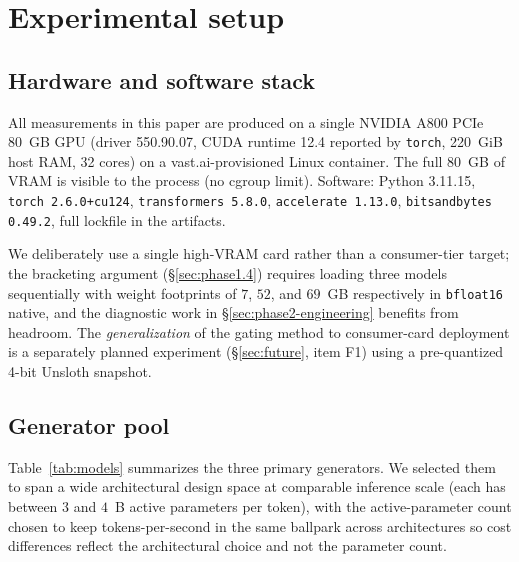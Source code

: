 \documentclass[11pt,letterpaper]{article}
\begin{document}
\section{Experimental setup}
\label{sec:setup}

\subsection{Hardware and software stack}
\label{sec:setup-hw}

All measurements in this paper are produced on a single NVIDIA A800
PCIe 80~GB GPU (driver 550.90.07, CUDA runtime 12.4 reported by
\texttt{torch}, 220~GiB host RAM, 32 cores) on a vast.ai-provisioned
Linux container. The full $80$~GB of VRAM is visible to the process
(no cgroup limit). Software: Python 3.11.15, \texttt{torch
2.6.0+cu124}, \texttt{transformers 5.8.0}, \texttt{accelerate 1.13.0},
\texttt{bitsandbytes 0.49.2}, full lockfile in the artifacts.

We deliberately use a single high-VRAM card rather than a consumer-tier
target; the bracketing argument (\S\ref{sec:phase1.4}) requires
loading three models sequentially with weight footprints of $7$, $52$,
and $69$~GB respectively in \texttt{bfloat16} native, and the diagnostic
work in \S\ref{sec:phase2-engineering} benefits from headroom. The
\emph{generalization} of the gating method to consumer-card deployment
is a separately planned experiment (\S\ref{sec:future}, item F1)
using a pre-quantized 4-bit Unsloth snapshot.

\subsection{Generator pool}
\label{sec:setup-models}

Table~\ref{tab:models} summarizes the three primary generators. We
selected them to span a wide architectural design space at comparable
inference scale (each has between $3$ and $4$~B active parameters per
token), with the active-parameter count chosen to keep tokens-per-second
in the same ballpark across architectures so cost differences reflect
the architectural choice and not the parameter count.
\end{document}
